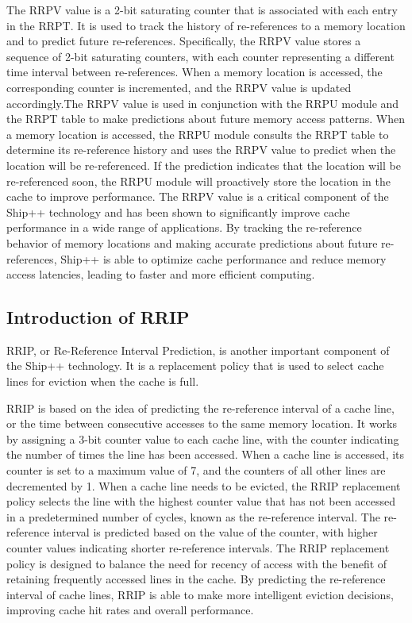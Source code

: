 The RRPV value is a 2-bit saturating counter that is associated with each entry in the RRPT. It is used to track the history of re-references to a memory location and to predict future re-references. Specifically, the RRPV value stores a sequence of 2-bit saturating counters, with each counter representing a different time interval between re-references. When a memory location is accessed, the corresponding counter is incremented, and the RRPV value is updated accordingly.\cite{doi}The RRPV value is used in conjunction with the RRPU module and the RRPT table to make predictions about future memory access patterns. When a memory location is accessed, the RRPU module consults the RRPT table to determine its re-reference history and uses the RRPV value to predict when the location will be re-referenced. If the prediction indicates that the location will be re-referenced soon, the RRPU module will proactively store the location in the cache to improve performance.\cite{C2010} The RRPV value is a critical component of the Ship++ technology and has been shown to significantly improve cache performance in a wide range of applications. By tracking the re-reference behavior of memory locations and making accurate predictions about future re-references, Ship++ is able to optimize cache performance and reduce memory access latencies, leading to faster and more efficient computing.\cite{llc}

\subsection{Introduction of RRIP}
RRIP, or Re-Reference Interval Prediction, is another important component of the Ship++ technology. It is a replacement policy that is used to select cache lines for eviction when the cache is full.\cite{Onur,kill}

RRIP is based on the idea of predicting the re-reference interval of a cache line, or the time between consecutive accesses to the same memory location. It works by assigning a 3-bit counter value to each cache line, with the counter indicating the number of times the line has been accessed.\cite{santh2007,San} When a cache line is accessed, its counter is set to a maximum value of 7, and the counters of all other lines are decremented by 1. When a cache line needs to be evicted, the RRIP replacement policy selects the line with the highest counter value that has not been accessed in a predetermined number of cycles, known as the re-reference interval.\cite{Wu2011} The re-reference interval is predicted based on the value of the counter, with higher counter values indicating shorter re-reference intervals. The RRIP replacement policy is designed to balance the need for recency of access with the benefit of retaining frequently accessed lines in the cache.\cite{Aamer2010,Sigarch2009} By predicting the re-reference interval of cache lines, RRIP is able to make more intelligent eviction decisions, improving cache hit rates and overall performance.\cite{Seshadri2015}

